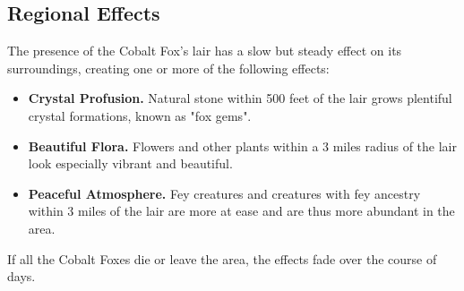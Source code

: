 \documentclass[letterpaper,openany,oneside,twocolumn]{book}
\begin{document}
\subsection*{Regional Effects}
The presence of the Cobalt Fox's lair has a slow but steady effect on its surroundings, creating one or more of the following effects:
\begin{itemize}
	\item \textbf{Crystal Profusion.} Natural stone within 500 feet of the lair grows plentiful crystal formations, known as "fox gems".
	\item \textbf{Beautiful Flora.} Flowers and other plants within a 3 miles radius of the lair look especially vibrant and beautiful.
	\item \textbf{Peaceful Atmosphere.} Fey creatures and creatures with fey ancestry within 3 miles of the lair are more at ease and are thus more abundant in the area.
\end{itemize}
If all the Cobalt Foxes die or leave the area, the effects fade over the course of  days.

\vfill\eject
\end{document}
